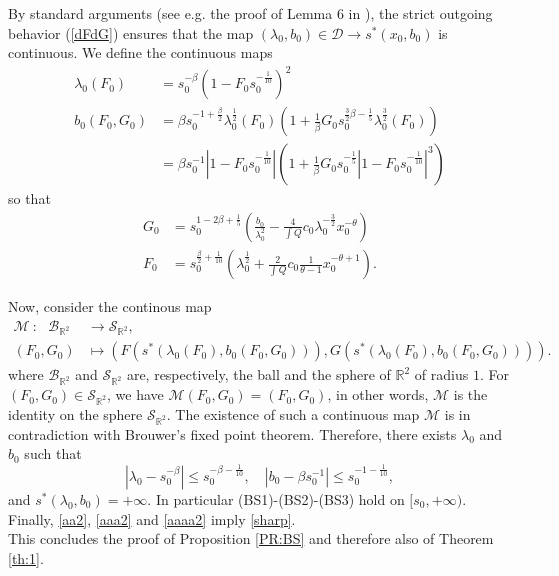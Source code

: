 \documentclass[11pt,a4paper,reqno]{amsart}
\theoremstyle{remark}
\numberwithin{equation}{section}
\newcommand{\be}{\begin{equation}}
\newcommand{\ee}{\end{equation}}
\def\RR{\mathbb{R}}
\def\fref#1{{\rm (\ref{#1})}}
\def\RR{\mathbb{R}}
\def\fref#1{{\rm (\ref{#1})}}
\def\l{\lambda}
\begin{document}
By  standard arguments (see e.g. the proof of Lemma 6 in \cite{MMC}),
the strict outgoing behavior \fref{dFdG} ensures that the map $(\l_0,b_0)\in \mathcal D \to s^*(x_0,b_0)$
is continuous.
We  define the continuous maps
\begin{align*}
 \l_0(F_0) &= s_0^{-\beta}\left( 1 - F_0 s_0^{-\frac 1{10}} \right)^2
\\
  b_0(F_0,G_0) &= \beta s_0^{-1+\frac \beta 2} \l_0^{\frac 12}(F_0 ) \left( 1+ \frac 1\beta G_0 s_0^{\frac 32\beta - \frac 1{5}}  \l_0^{\frac 32} (F_0)
   \right)\\
  & = \beta s_0^{-1} \left| 1 - F_0 s_0^{-\frac 1{10}}\right|
  \left( 1+ \frac 1\beta G_0 s_0^{- \frac 1{5}}  \left| 1 - F_0 s_0^{-\frac 1{10}}\right|^3
   \right)
\end{align*}
so that
\begin{align*}
G_0 &= s_0^{1-2 \beta +\frac 1{5}} \left( \frac {b_0}{\l_0^2} 
- \frac 4{\int Q} c_0  \l_0^{-\frac 32} x_0^{-\theta}\right)\\
F_0 &= s_0^{\frac \beta 2 +\frac 1{10}} \left( \l_0^{\frac 12} 
+\frac 2{\int Q} c_0 \frac 1{\theta-1} x_0^{-\theta+1} \right).
\end{align*}

Now, consider the continous map
\begin{align*}
\mathcal M \ : \ \   \   \mathcal B_{\RR^2}  &\to  \mathcal S_{\RR^2} ,\\
   (F_0,G_0) &\mapsto \left(F(s^*(\l_0(F_0),b_0(F_0,G_0))), G(s^*(\l_0(F_0),b_0(F_0,G_0)))\right).
\end{align*}
where $\mathcal B_{\RR^2}$ and $\mathcal S_{\RR^2} $ are, respectively, the ball and  the sphere of $\RR^2$ of radius $1$. For $(F_0,G_0)\in \mathcal S_{\RR^2}$, we have
$\mathcal M(F_0,G_0) = (F_0,G_0)$, in other words, 
$\mathcal M$ is the identity on the sphere
$\mathcal S_{\RR^2}$. The existence of such a continuous map 
$\mathcal M$ is  in contradiction with Brouwer's fixed point theorem. Therefore, there exists $\l_0$ and $b_0$ such that
\be\label{estimation}
| \l_0 - s_0^{-\beta}| \leq s_0^{-\beta - \frac 1{10}},
\quad |b_0 - \beta s_0^{-1}| \leq s_0^{-1- \frac 1{10}},
\ee
and $s^*(\l_0,b_0)=+\infty$. 
In particular (BS1)-(BS2)-(BS3) hold on $[s_0,+\infty)$.\\
Finally, \eqref{aa2}, \eqref{aaa2} and \eqref{aaaa2} imply \eqref{sharp}.\\

This concludes the proof of Proposition \ref{PR:BS} and therefore also of Theorem \ref{th:1}. 
  
\end{document}
